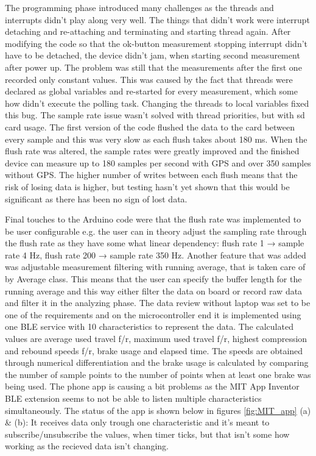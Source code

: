 \documentclass[a4paper,11pt]{article}
\begin{document}
The programming phase introduced many challenges as the threads and interrupts didn't play along very well. The things that didn't work were interrupt detaching and re-attaching and terminating and starting thread again. After modifying the code so that the ok-button measurement stopping interrupt didn't have to be detached, the device didn't jam, when starting second measurement after power up. The problem was still that the measurements after the first one recorded only constant values. This was caused by the fact that threads were declared as global variables and re-started for every measurement, which some how didn't execute the polling task. Changing the threads to local variables fixed this bug. The sample rate issue wasn't solved with thread priorities, but with sd card usage. The first version of the code flushed the data to the card between every sample and this was very slow as each flush takes about 180 ms. When the flush rate was altered, the sample rates were greatly improved and the finished device can measure up to 180 samples per second with GPS and over 350 samples without GPS. The higher number of writes between each flush means that the risk of losing data is higher, but testing hasn't yet shown that this would be significant as there has been no sign of lost data.

Final touches to the Arduino code were that the flush rate was implemented to be user configurable e.g. the user can in theory adjust the sampling rate through the flush rate as they have some what linear dependency: flush rate 1 → sample rate 4 Hz, flush rate 200 → sample rate 350 Hz. Another feature that was added was adjustable measurement filtering with running average, that is taken care of by Average class. This means that the user can specify the buffer length for the running average and this way either filter the data on board or record raw data and filter it in the analyzing phase. The data review without laptop was set to be one of the requirements and on the microcontroller end it is implemented using one BLE service with 10 characteristics to represent the data. The calculated values are average used travel f/r, maximum used travel f/r, highest compression and rebound speeds f/r, brake usage and elapsed time. The speeds are obtained through numerical differentiation and the brake usage is calculated by comparing the number of sample points to the number of points when at least one brake was being used. The phone app is causing a bit problems as the MIT App Inventor BLE extension seems to not be able to listen multiple characteristics simultaneously. The status of the app is shown below in figures \ref{fig:MIT_app} (a) \& (b): It receives data only trough one characteristic and it's meant to subscribe/unsubscribe the values, when timer ticks, but that isn't some how working as the recieved data isn't changing.
\end{document}
